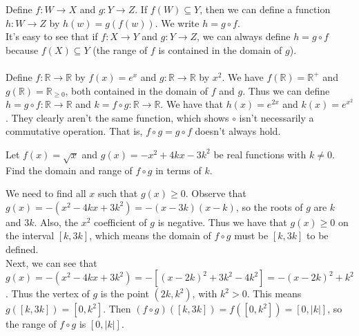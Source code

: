 \documentclass[12pt, a4paper, titlepage, twoside]{article}
\newcommand*{\R}{\mathbb{R}}
\newcounter{excount}[subsection]
\begin{document}
	\begin{kp}
		Define $f : W \to X$ and $g : Y \to Z$. If $f(W) \subseteq Y$, then we can define a function $h : W \to Z$ by
		$h(w) = g(f(w))$. We write $h = g \circ f$.\\
		
		It's easy to see that if $f : X \to Y$ and $g : Y \to Z$, we can always define $h = g \circ f$ because $f(X) \subseteq Y$ (the range of
		$f$ is contained in the domain of $g$).
	\end{kp}
	
	\paragraph{}
	Define $f : \R \to \R$ by $f(x) = e^x$ and $g : \R \to \R$ by $x^2$. We have $f(\R) = \R^+$ and $g(\R) = \R_{\geqslant 0}$, both contained
	in the domain of $f$ and $g$. Thus we can define $h = g \circ f : \R \to \R$ and $k = f \circ g : \R \to \R$. We have that
	$h(x) = e^{2x}$ and $k(x) = e^{x^2}$. They clearly aren't the same function, which shows $\circ$ isn't necessarily a commutative operation.
	That is, $f \circ g = g \circ f$ doesn't always hold.\\
	
	\begin{ex}
		Let $f(x) = \sqrt{x}$ and $g(x) = -x^2 + 4kx - 3k^2$ be real functions with $k \neq 0$. Find the domain and range of $f \circ g$ in terms of 
		$k$.
		
		\hfill
		\tcbline
		\hfill
		
		We need to find all $x$ such that $g(x) \geqslant 0$. Observe that $g(x) = -(x^2 - 4kx + 3k^2) = -(x-3k)(x-k)$, so the roots of $g$ are
		$k$ and $3k$. Also, the $x^2$ coefficient of $g$ is negative. Thus we have that $g(x) \geqslant 0$ on the interval $[k, 3k]$, which
		means the domain of $f \circ g$ must be $[k, 3k]$ to be defined.\\
		
		Next, we can see that $g(x) = -(x^2 - 4kx + 3k^2) = -[(x-2k)^2 + 3k^2 - 4k^2] = -(x-2k)^2 + k^2$. Thus the vertex of $g$ is the point
		$(2k, k^2)$, with $k^2 > 0$. This means $g([k, 3k]) = [0,k^2]$. Then $(f \circ g)([k, 3k]) = f([0, k^2]) = [0, |k|]$, so the range of
		$f \circ g$ is $[0, |k|]$.
	\end{ex}
	
\end{document}
